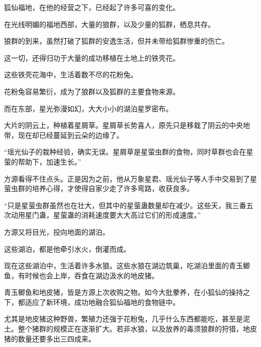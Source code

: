 \begin{this_body}
狐仙福地，在他的经营之下，已经起了许多可喜的变化。

在光线明媚的福地西部，大量的狼群，以及少量的狐群，栖息共存。

狼群的到来，虽然打破了狐群的安逸生活，但并未带给狐群惨重的伤亡。

这一切，还得归功于大量的成功移植在土地上的铁壳花。

这些铁壳花海中，生活着数不尽的花粉兔。

花粉兔容易繁衍，成为了狼群以及狐群的主要食物来源。

而在东部，星光弥漫如幻，大大小小的湖泊星罗密布。

大片的阴云上，种植着星屑草。星屑草长势喜人，原先只是移栽了阴云的中央地带，现在却已经蔓延到云朵的边缘了。

“瑶光仙子的栽种经验，确实无误。星屑草是星萤虫群的食物，同时草群也会在星萤的帮助下，加速生长。”

方源看得不住点头。正是因为之前，他从万象星君、瑶光仙子等人手中交易到了星萤虫群的培养心得，才使得自家少走了许多弯路，收获良多。

“只是星萤虫群虽然也在壮大，但其中的星萤蛊数量却在减少。这些天，我三番五次动用星门蛊，星萤蛊的消耗速度要大大高过它们的形成速度。”

方源又将目光，投向地面的湖泊。

这些湖泊，都是他牵引水火，倒灌而成。

现在这些湖泊中，生活着许多水狼。这些水狼在湖边筑巢，吃湖泊里面的青玉鲫鱼，有时候也会上岸，吞食在湖边汲水的地皮猪。

青玉鲫鱼和地皮猪，皆是方源上次收购之物。如今大批豢养，在小狐仙的操持之下，都适应了新环境，成功地融合狐仙福地的食物链中。

尤其是地皮猪这种野兽，繁殖力还强于花粉兔，几乎什么东西都能吃，甚至是泥土。整个猪群的规模正在逐渐扩大。若非水狼，以及放养的毒须狼群的狩猎，地皮猪的数量还要多出三四成来。

\end{this_body}

